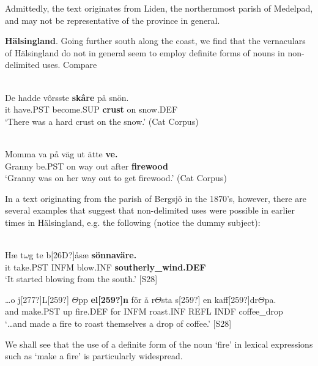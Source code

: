 \z

Admittedly, the text originates from Liden, the northernmost parish of Medelpad, and may not be representative of the province in general. 

\textbf{Hälsingland}. Going further south along the coast, we find that the vernaculars of Hälsingland do not in general seem to employ definite forms of nouns in non-delimited uses. Compare 

\ea \label{} 
\\
\gll De  hadde  vôrsste  \textbf{skâre} på  snön.\\
it  have.PST  become.SUP  \textbf{crust} on  snow.DEF\\
\glt ‘There was a hard crust on the snow.’ (Cat Corpus)

\z

\ea \label{} 
\\
\gll Momma  va  på  väg  ut  ätte  \textbf{ve.}\\
Granny  be.PST  on  way  out  after  \textbf{firewood}\\
\glt ‘Granny was on her way out to get firewood.’ (Cat Corpus)

\z

In a text originating from the parish of Bergsjö in the 1870’s, however, there are several examples that suggest that non-delimited uses were possible in earlier times in Hälsingland, e.g. the following (notice the dummy subject):

\ea\label{}
\\
\gll Hæ  t$\omega $g  te  b[26D?]åsæ  \textbf{sönnaväre.}\\
it  take.PST  INFM  blow.INF  \textbf{southerly\_wind.DEF}\\
\glt ‘It started blowing from the south.’ [S28]

\z

\ea
\gll …o  j[277?]L[259?]  $\Theta $pp  \textbf{el[259?]n} för  å  r$\Theta $sta  s[259?]  en  kaff[259?]dr$\Theta $pa.\\
and  make.PST  up  fire.DEF  for  INFM  roast.INF  REFL  INDF  coffee\_drop\\
\glt ‘…and made a fire to roast themselves a drop of coffee.’ [S28]

\z

We shall see that the use of a definite form of the noun ‘fire’ in lexical expressions such as ‘make a fire’ is particularly widespread.

